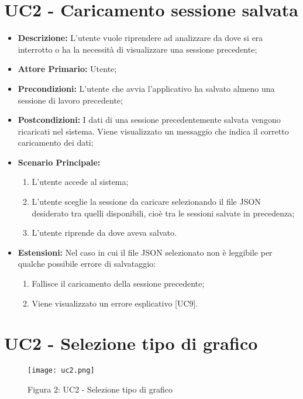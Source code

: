 \section{UC2 - Caricamento sessione salvata}
\begin{itemize}
  \item \textbf{Descrizione:} L'utente vuole riprendere ad analizzare da dove si era interrotto
  o ha la necessità di visualizzare una sessione precedente;
  \item \textbf{Attore Primario:} Utente;
  \item \textbf{Precondizioni:} L'utente che avvia l'applicativo ha salvato almeno una sessione di lavoro precedente;
  \item \textbf{Postcondizioni:} I dati di una sessione precedentemente salvata vengono ricaricati nel sistema. Viene visualizzato un messaggio che indica il corretto caricamento dei dati;
  \item \textbf{Scenario Principale:}
  \begin{enumerate}
    \item L'utente accede al sistema;
    \item L'utente sceglie la sessione da caricare selezionando il file JSON desiderato tra quelli disponibili,
    cioè tra le sessioni salvate in precedenza;
    \item L'utente riprende da dove aveva salvato.
  \end{enumerate}
  \item \textbf{Estensioni:}
  Nel caso in cui il file JSON selezionato non è leggibile per qualche possibile errore di salvataggio:
    \begin{enumerate}
      \item Fallisce il caricamento della sessione precedente;
      \item Viene visualizzato un errore esplicativo [UC9].
    \end{enumerate}
\end{itemize}

\section{UC2 - Selezione tipo di grafico}
\begin{figure}[H]
 \texttt{[image: uc2.png]}
 \vspace{-5mm}
 \caption*{Figura 2: UC2 - Selezione tipo di grafico}
\end{figure}

